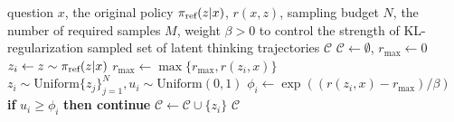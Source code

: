\begin{algorithm}[t]
\caption{Latent Thinking Optimization}
\label{alg:latent_probabilistic_sampling}
\small
\begin{algorithmic}[1]
\Require question $x$, the original policy $\pi_\text{ref}(z|x)$, \LRM $r(x,z)$, sampling budget $N$, the number of required samples $M$, weight $\beta>0$ to control the strength of KL-regularization
\Ensure sampled set of latent thinking trajectories $\mathcal{C}$
\State $\mathcal{C}\gets\emptyset$, $r_{\text{max}}\gets 0$\textcolor{darkblue}{}
    \State $z_i \gets z \sim \pi_\text{ref}(z|x)$\textcolor{darkblue}{}
    \State $r_{\text{max}}\gets \max\{r_{\text{max}}, r(z_i,x)\}$\textcolor{darkblue}{}
\EndFor
{}\textcolor{darkblue}{}
    \State $z_i \sim \text{Uniform}\{z_j\}_{j=1}^N, u_i\sim\text{Uniform}(0, 1)$
    \State $\phi_i\gets\exp((r(z_i,x)-r_{\text{max}} )/\beta)$\textcolor{darkblue}{}
    \State\textbf{if} $u_i \geq \phi_i$ \textbf{then continue}\textcolor{darkblue}{}
    \State $\mathcal{C}\gets\mathcal{C}\cup\{z_i\}$\textcolor{darkblue}{}
\EndWhile
\State\Return $\mathcal{C}$
\end{algorithmic}
\end{algorithm}

